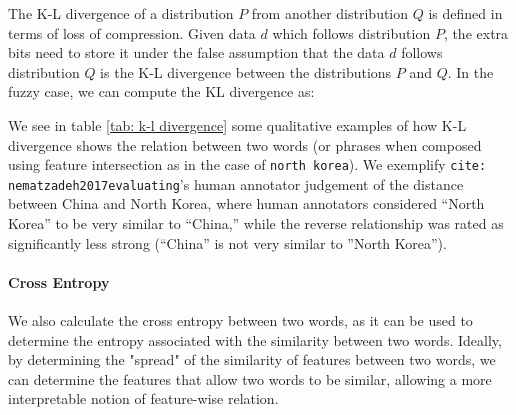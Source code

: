 \documentclass[11pt]{book}
\newcommand{\infdiv}{D\infdivx}
\newcommand{\citet}[1]{\texttt{cite: #1}}
\begin{document}
The K-L divergence of a distribution $P$ from another distribution $Q$ is
defined in terms of loss of compression. Given data $d$ which follows
distribution $P$, the extra bits need to store it under the false assumption
that the data $d$ follows distribution $Q$ is the K-L divergence between the
distributions $P$ and $Q$. In the fuzzy case, we can compute the KL divergence
as:

% 

We see in table \ref{tab: k-l divergence} some qualitative examples of how K-L
divergence shows the relation between two words (or phrases when composed using
feature intersection as in the case of \texttt{north korea}). We exemplify
\citet{nematzadeh2017evaluating}'s human annotator judgement of the distance
between China and North Korea, where human annotators considered “North Korea”
to be very similar to “China,” while the reverse relationship was rated as
significantly less strong (“China” is not very similar to ”North Korea”).

\paragraph{Cross Entropy} We also calculate the cross entropy between two
words, as it can be used to determine the entropy associated with the
similarity between two words. Ideally, by determining the "spread" of the
similarity of features between two words, we can determine the features that
allow two words to be similar, allowing a more interpretable notion of
feature-wise relation. 
\end{document}
